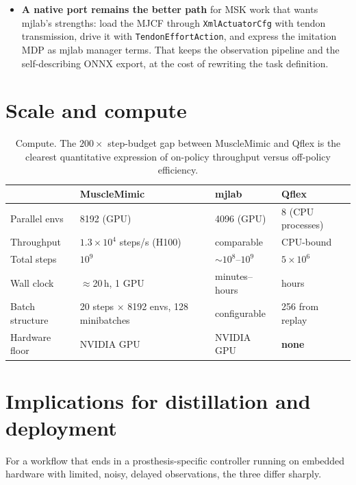 \documentclass[11pt,a4paper]{article}
\begin{document}
\begin{itemize}[leftmargin=1.4em,itemsep=0.3em]
\item \textbf{A native port remains the better path} for MSK work that wants mjlab's
strengths: load the MJCF through \texttt{XmlActuatorCfg} with tendon transmission, drive it
with \texttt{TendonEffortAction}, and express the imitation MDP as mjlab manager terms.
That keeps the observation pipeline and the self-describing ONNX export, at the cost of
rewriting the task definition.
\end{itemize}

\section{Scale and compute}

\begin{table}[h!]
\centering
\small
\begin{tabular}{@{}lL{2.9cm}L{2.9cm}L{3.4cm}@{}}
\toprule
 & \textcolor{mmC}{MuscleMimic} & \textcolor{mjC}{mjlab} & \textcolor{qfC}{Qflex} \\
\midrule
Parallel envs & 8192 (GPU) & 4096 (GPU) & 8 (CPU processes) \\
Throughput & $1.3\times10^4$ steps/s (H100) & comparable & CPU-bound \\
Total steps & $10^9$ & $\sim\!10^8$--$10^9$ & $5\times10^6$ \\
Wall clock & $\approx$20\,h, 1 GPU & minutes--hours & hours \\
Batch structure & 20 steps $\times$ 8192 envs, 128 minibatches & configurable & 256 from replay \\
Hardware floor & NVIDIA GPU & NVIDIA GPU & \textbf{none} \\
\bottomrule
\end{tabular}
\caption{Compute. The $200\times$ step-budget gap between MuscleMimic and Qflex is the
clearest quantitative expression of on-policy throughput versus off-policy efficiency.}
\end{table}

\section{Implications for distillation and deployment}
\label{sec:distill}

For a workflow that ends in a prosthesis-specific controller running on embedded hardware
with limited, noisy, delayed observations, the three differ sharply.
\end{document}
